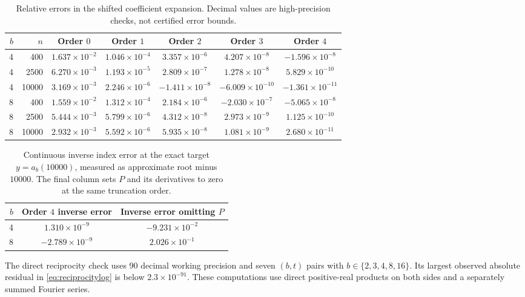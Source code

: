 \begin{table}[htbp]
\centering\small
\setlength{\tabcolsep}{4pt}
\begin{tabular}{@{}rrccccc@{}}
\toprule
$b$ & $n$ & Order $0$ & Order $1$ & Order $2$ & Order $3$ & Order $4$ \\
\midrule
4 & 400 & $1.637\times10^{-2}$ & $1.046\times10^{-4}$ & $3.357\times10^{-6}$ & $4.207\times10^{-8}$ & $-1.596\times10^{-8}$ \\
4 & 2500 & $6.270\times10^{-3}$ & $1.193\times10^{-5}$ & $2.809\times10^{-7}$ & $1.278\times10^{-8}$ & $5.829\times10^{-10}$ \\
4 & 10000 & $3.169\times10^{-3}$ & $2.246\times10^{-6}$ & $-1.411\times10^{-8}$ & $-6.009\times10^{-10}$ & $-1.361\times10^{-11}$ \\
8 & 400 & $1.559\times10^{-2}$ & $1.312\times10^{-4}$ & $2.184\times10^{-6}$ & $-2.030\times10^{-7}$ & $-5.065\times10^{-8}$ \\
8 & 2500 & $5.444\times10^{-3}$ & $5.799\times10^{-6}$ & $4.312\times10^{-8}$ & $2.973\times10^{-9}$ & $1.125\times10^{-10}$ \\
8 & 10000 & $2.932\times10^{-3}$ & $5.592\times10^{-6}$ & $5.935\times10^{-8}$ & $1.081\times10^{-9}$ & $2.680\times10^{-11}$ \\
\bottomrule
\end{tabular}
\caption{Relative errors in the shifted coefficient expansion. Decimal values are high-precision checks, not certified error bounds.}
\label{tab:counts}
\end{table}
\begin{table}[htbp]
\centering
\begin{tabular}{@{}rcc@{}}
\toprule
$b$ & Order $4$ inverse error & Inverse error omitting $P$ \\
\midrule
4 & $1.310\times10^{-9}$ & $-9.231\times10^{-2}$ \\
8 & $-2.789\times10^{-9}$ & $2.026\times10^{-1}$ \\
\bottomrule
\end{tabular}
\caption{Continuous inverse index error at the exact target $y=a_b(10000)$, measured as approximate root minus $10000$. The final column sets $P$ and its derivatives to zero at the same truncation order.}
\label{tab:inverse}
\end{table}
\noindent The direct reciprocity check uses 90 decimal working precision and seven $(b,t)$ pairs with $b\in\{2,3,4,8,16\}$. Its largest observed absolute residual in \eqref{eq:reciprocitylog} is below $2.3\times10^{-91}$. These computations use direct positive-real products on both sides and a separately summed Fourier series.
